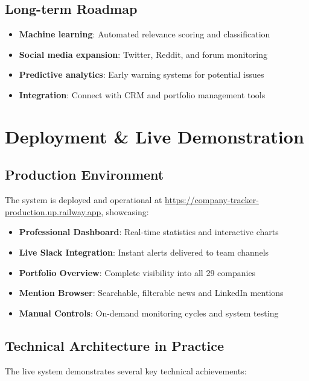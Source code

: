\documentclass[11pt]{article}
\begin{document}
\subsection{Long-term Roadmap}
\begin{itemize}
    \item \textbf{Machine learning}: Automated relevance scoring and classification
    \item \textbf{Social media expansion}: Twitter, Reddit, and forum monitoring
    \item \textbf{Predictive analytics}: Early warning systems for potential issues
    \item \textbf{Integration}: Connect with CRM and portfolio management tools
\end{itemize}

\section{Deployment \& Live Demonstration}

\subsection{Production Environment}

The system is deployed and operational at \url{https://company-tracker-production.up.railway.app}, showcasing:

\begin{itemize}
    \item \textbf{Professional Dashboard}: Real-time statistics and interactive charts
    \item \textbf{Live Slack Integration}: Instant alerts delivered to team channels
    \item \textbf{Portfolio Overview}: Complete visibility into all 29 companies
    \item \textbf{Mention Browser}: Searchable, filterable news and LinkedIn mentions
    \item \textbf{Manual Controls}: On-demand monitoring cycles and system testing
\end{itemize}

\subsection{Technical Architecture in Practice}

The live system demonstrates several key technical achievements:
\end{document}
